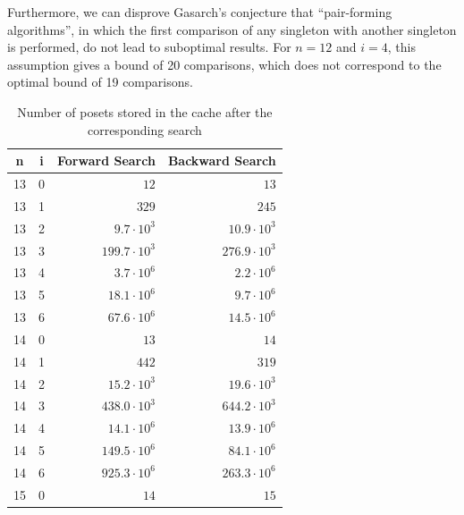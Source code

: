 \documentclass[10pt,journal,compsoc]{IEEEtran}
\begin{document}
Furthermore, we can disprove Gasarch's \cite{Gasarch1996} conjecture that “pair-forming algorithms”, in which the first comparison of any singleton with another singleton is performed, do not lead to suboptimal results.
For $n = 12$ and $i = 4$, this assumption gives a bound of 20 comparisons, which does not correspond to the optimal bound of 19 comparisons.

\begin{table}[!t]
  \renewcommand{\arraystretch}{1.2}
  \caption{Number of posets stored in the cache after the corresponding search}
  \label{table:cache_entries}
  \centering
  \begin{tabular}{c|c|r|r}
    \textbf{n} & \textbf{i} & \textbf{Forward Search} & \textbf{Backward Search} \\
    \hline
    13         & 0          & $12$                    & $13$                     \\
    13         & 1          & $329$                   & $245$                    \\
    13         & 2          & $9.7 \cdot 10^3$        & $10.9 \cdot 10^3$        \\
    13         & 3          & $199.7 \cdot 10^3$      & $276.9 \cdot 10^3$       \\
    13         & 4          & $3.7 \cdot 10^6$        & $2.2 \cdot 10^6$         \\
    13         & 5          & $18.1 \cdot 10^6$       & $9.7 \cdot 10^6$         \\
    13         & 6          & $67.6 \cdot 10^6$       & $14.5 \cdot 10^6$        \\
    \hline
    14         & 0          & $13$                    & $14$                     \\
    14         & 1          & $442$                   & $319$                    \\
    14         & 2          & $15.2 \cdot 10^3$       & $19.6 \cdot 10^3$        \\
    14         & 3          & $438.0 \cdot 10^3$      & $644.2 \cdot 10^3$       \\
    14         & 4          & $14.1 \cdot 10^6$       & $13.9 \cdot 10^6$        \\
    14         & 5          & $149.5 \cdot 10^6$      & $84.1 \cdot 10^6$        \\
    14         & 6          & $925.3 \cdot 10^6$      & $263.3 \cdot 10^6$       \\
    \hline
    15         & 0          & $14$                    & $15$                     \\

\end{tabular}
\end{table}
\end{document}
